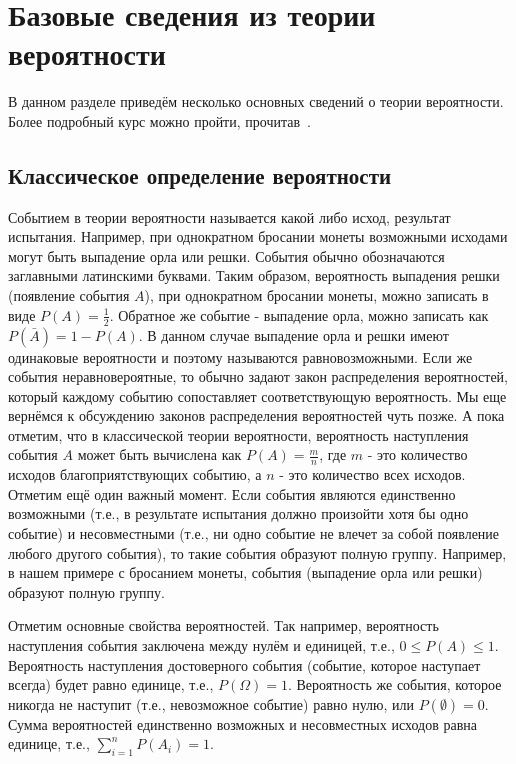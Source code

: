 \section{Базовые сведения из теории вероятности}

В данном разделе приведём несколько основных сведений о теории вероятности. 
Более подробный курс можно пройти, прочитав~\cite{turner:probability, kremer:probability}.

\subsection{Классическое определение вероятности}

Событием в теории вероятности называется какой либо исход, 
результат испытания. Например, при однократном бросании 
монеты возможными исходами могут быть выпадение орла или 
решки. События обычно обозначаются заглавными 
латинскими буквами. Таким образом, вероятность выпадения решки (появление 
события $A$), при однократном бросании монеты, можно записать в виде 
$P(A) = \frac{1}{2}$. Обратное же событие - выпадение орла, 
можно записать как $P(\bar{A})=1-P(A)$. В данном случае 
выпадение орла и решки имеют одинаковые вероятности и поэтому называются 
равновозможными. Если же события неравновероятные, то обычно 
задают закон распределения вероятностей, который каждому 
событию сопоставляет соответствующую вероятность. Мы еще вернёмся к
обсуждению законов распределения вероятностей чуть позже. А пока отметим, что 
в классической теории вероятности, вероятность наступления события $A$
может быть вычислена как $P(A)=\frac{m}{n}$, где $m$ - это 
количество исходов благоприятствующих событию, а $n$ - это количество
всех исходов. Отметим ещё один важный момент. Если события 
являются единственно возможными (т.е., в результате испытания
должно произойти хотя бы одно событие) и несовместными (т.е., ни одно 
событие не влечет за собой появление любого другого события), то такие события 
образуют полную группу. Например, в нашем примере с бросанием
монеты, события (выпадение орла или решки) образуют полную группу.

Отметим основные свойства вероятностей. Так например, вероятность 
наступления события заключена между нулём и единицей, т.е., $0 \le P(A) \le 1$.
Вероятность наступления достоверного события (событие, которое наступает
всегда) будет равно единице, т.е., $P(\Omega) = 1$. Вероятность же 
события, которое никогда не наступит (т.е., невозможное событие)
равно нулю, или $P(\emptyset)=0$. Сумма вероятностей единственно возможных и 
несовместных исходов равна единице, т.е., $\sum_{i=1}^nP(A_i)=1$.

